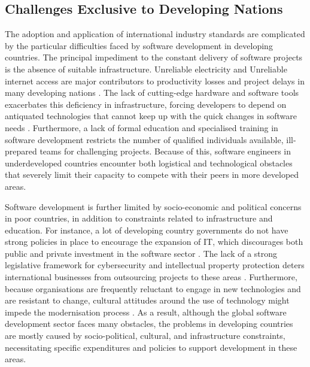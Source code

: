 \subsection{Challenges Exclusive to Developing Nations}
\par{The adoption and application of international industry standards are complicated by the particular difficulties faced by software development in developing countries. The principal impediment to the constant delivery of software projects is the absence of suitable infrastructure. Unreliable electricity and Unreliable internet access are major contributors to productivity losses and project delays in many developing nations \citep{heeks2017information}. The lack of cutting-edge hardware and software tools exacerbates this deficiency in infrastructure, forcing developers to depend on antiquated technologies that cannot keep up with the quick changes in software needs \citep{helton2012bridging}. Furthermore, a lack of formal education and specialised training in software development restricts the number of qualified individuals available, ill-prepared teams for challenging projects. Because of this, software engineers in underdeveloped countries encounter both logistical and technological obstacles that severely limit their capacity to compete with their peers in more developed areas.

Software development is further limited by socio-economic and political concerns in poor countries, in addition to constraints related to infrastructure and education. For instance, a lot of developing country governments do not have strong policies in place to encourage the expansion of IT, which discourages both public and private investment in the software sector \cite{ojo2020political}. The lack of a strong legislative framework for cybersecurity and intellectual property protection deters international businesses from outsourcing projects to these areas \citep{heeks2017information}. Furthermore, because organisations are frequently reluctant to engage in new technologies and are resistant to change, cultural attitudes around the use of technology might impede the modernisation process \citep{helton2012bridging}. As a result, although the global software development sector faces many obstacles, the problems in developing countries are mostly caused by socio-political, cultural, and infrastructure constraints, necessitating specific expenditures and policies to support development in these areas.}
